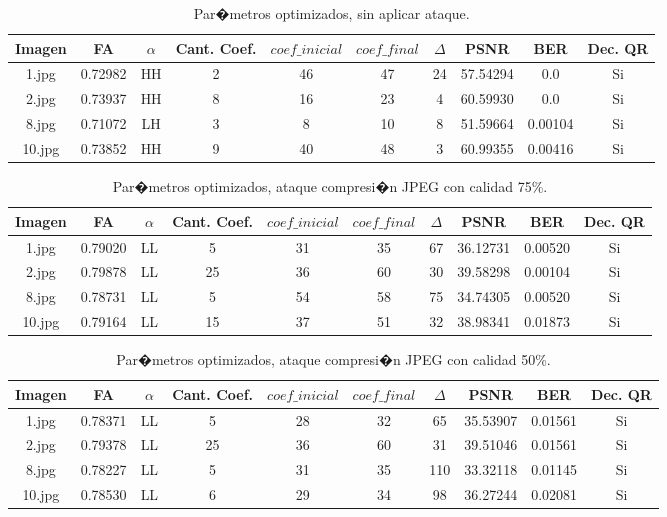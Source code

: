 \documentclass{rcci} %
\begin{document}
\begin{table}[H]
\centering
\begin{tabular}{|c|c|c|c|c|c|c|c|c|c|}
\hline
Imagen & FA & $\alpha$ & Cant. Coef. & $coef\_inicial$ & $coef\_final$ & $\Delta$ & PSNR & BER & Dec. QR \\\hline
1.jpg & 0.72982 & HH & 2 & 46 & 47 & 24 & 57.54294 & 0.0 & Si \\
2.jpg & 0.73937 & HH & 8 & 16 & 23 & 4 & 60.59930 & 0.0 & Si \\
8.jpg & 0.71072 & LH & 3 & 8 & 10 & 8 & 51.59664 & 0.00104 & Si \\
10.jpg & 0.73852 & HH & 9 & 40 & 48 & 3 & 60.99355 & 0.00416 & Si \\\hline
\end{tabular}
\caption{Par�metros optimizados, sin aplicar ataque.}
\end{table}

\begin{table}[H]
\centering
\begin{tabular}{|c|c|c|c|c|c|c|c|c|c|}
\hline
Imagen & FA & $\alpha$ & Cant. Coef. & $coef\_inicial$ & $coef\_final$ & $\Delta$ & PSNR & BER & Dec. QR \\\hline
1.jpg & 0.79020 & LL & 5 & 31 & 35 & 67 & 36.12731 & 0.00520 & Si \\
2.jpg & 0.79878 & LL & 25 & 36 & 60 & 30 & 39.58298 & 0.00104 & Si \\
8.jpg & 0.78731 & LL & 5 & 54 & 58 & 75 & 34.74305 & 0.00520 & Si \\
10.jpg & 0.79164 & LL & 15 & 37 & 51 & 32 & 38.98341 & 0.01873 & Si \\\hline
\end{tabular}
\caption{Par�metros optimizados, ataque compresi�n JPEG con calidad 75\%.}
\end{table}

\begin{table}[H]
\centering
\begin{tabular}{|c|c|c|c|c|c|c|c|c|c|}
\hline
Imagen & FA & $\alpha$ & Cant. Coef. & $coef\_inicial$ & $coef\_final$ & $\Delta$ & PSNR & BER & Dec. QR \\\hline
1.jpg & 0.78371 & LL & 5 & 28 & 32 & 65 & 35.53907 & 0.01561 & Si \\
2.jpg & 0.79378 & LL & 25 & 36 & 60 & 31 & 39.51046 & 0.01561 & Si \\
8.jpg & 0.78227 & LL & 5 & 31 & 35 & 110 & 33.32118 & 0.01145 & Si \\
10.jpg & 0.78530 & LL & 6 & 29 & 34 & 98 & 36.27244 & 0.02081 & Si \\\hline
\end{tabular}
\caption{Par�metros optimizados, ataque compresi�n JPEG con calidad 50\%.}
\end{table}
\end{document}
